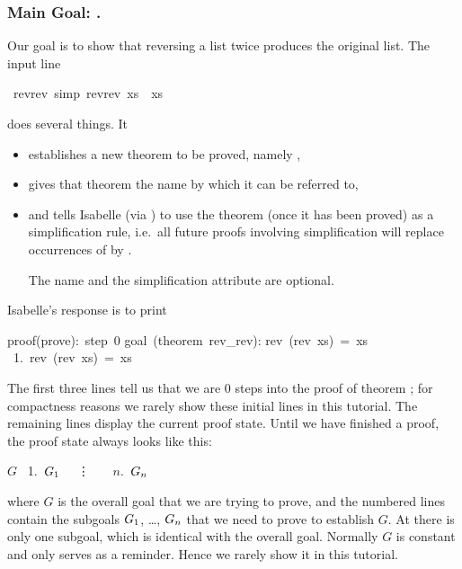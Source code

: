 \begin{isabellebody}
\begin{isamarkuptext}
\subsubsection*{Main Goal: .}

Our goal is to show that reversing a list twice produces the original
list. The input line%
\end{isamarkuptext}%
\ rev{\isacharunderscore}rev\ {\isacharbrackleft}simp{\isacharbrackright}{\isacharcolon}\ {\isachardoublequote}rev{\isacharparenleft}rev\ xs{\isacharparenright}\ {\isacharequal}\ xs{\isachardoublequote}%
\begin{isamarkuptxt}%
%
\noindent
does several things.  It
\begin{itemize}
\item
establishes a new theorem to be proved, namely ,
\item
gives that theorem the name  by which it can be
referred to,
\item
and tells Isabelle (via ) to use the theorem (once it has been
proved) as a simplification rule, i.e.\ all future proofs involving
simplification will replace occurrences of  by
.

The name and the simplification attribute are optional.
\end{itemize}
Isabelle's response is to print
\begin{isabelle}
proof(prove):~step~0\isanewline
\isanewline
goal~(theorem~rev\_rev):\isanewline
rev~(rev~xs)~=~xs\isanewline
~1.~rev~(rev~xs)~=~xs
\end{isabelle}
The first three lines tell us that we are 0 steps into the proof of
theorem ; for compactness reasons we rarely show these
initial lines in this tutorial. The remaining lines display the current
proof state.
Until we have finished a proof, the proof state always looks like this:
\begin{isabelle}
$G$\isanewline
~1.~$G\sb{1}$\isanewline
~~\vdots~~\isanewline
~$n$.~$G\sb{n}$
\end{isabelle}
where $G$
is the overall goal that we are trying to prove, and the numbered lines
contain the subgoals $G\sb{1}$, \dots, $G\sb{n}$ that we need to prove to
establish $G$. At  there is only one subgoal, which is
identical with the overall goal.  Normally $G$ is constant and only serves as
a reminder. Hence we rarely show it in this tutorial.


\end{isamarkuptxt}
\end{isabellebody}
